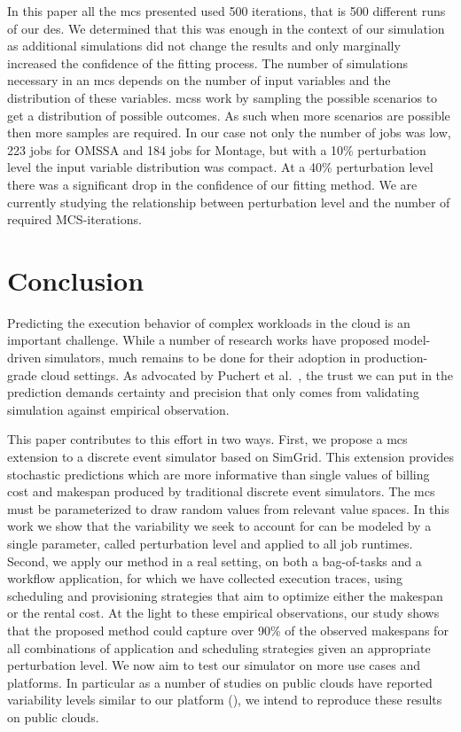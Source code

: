 \documentclass[10pt,conference,compsocconf]{IEEEtran}
\begin{document}
In this paper all the \ac{mcs} presented used 500 iterations, that is 500
different runs of our \ac{des}. We determined that this was enough in the
context of our simulation as additional simulations did not change the results
and only marginally increased the confidence of the fitting process. The number
of simulations necessary in an \ac{mcs} depends on the number of input variables
and the distribution of these variables. \aclp{mcs} work by sampling the possible
scenarios to get a distribution of possible outcomes. As such when more scenarios are
possible then more samples are required. In our case not only the number of jobs
was low, 223 jobs for OMSSA and 184 jobs for Montage, but with a 10\%
perturbation level the input variable distribution was compact. At a 40\%
perturbation level there was a significant drop in the confidence of our fitting
method. We are currently studying the relationship between perturbation level
and the number of required MCS-iterations.

\section{Conclusion}
Predicting  the execution  behavior  of complex  workloads in  the  cloud is  an
important challenge. While a number of research works have proposed model-driven
simulators, much remains to be done for their adoption in production-grade cloud
settings. As  advocated by Puchert  et al.~\cite{PucherGWK15}, the trust  we can
put in  the prediction  demands certainty  and precision  that only  comes from
validating simulation against empirical observation.

This paper contributes to this effort in two ways. First, we propose a \acl{mcs}
extension  to a  discrete  event  simulator based  on  SimGrid.  This  extension
provides stochastic predictions which are more informative than single values of
billing cost  and makespan  produced by  traditional discrete  event simulators.
The \acl{mcs}  must be parameterized to  draw random values from  relevant value
spaces. In this work we show that the  variability we seek to account for can be
modeled  by a  single parameter,  called perturbation  level and applied  to all  job
runtimes. Second, we apply our method in  a real setting, on both a bag-of-tasks
and a workflow  application, for which we have collected  execution traces, using
scheduling and provisioning strategies that  aim to optimize either the makespan
or the  rental cost.  At  the light to  these empirical observations,  our study
shows that the proposed method could capture over 90\% of the observed makespans
for  all  combinations  of  application   and  scheduling  strategies  given  an
appropriate perturbation  level.  We now aim  to test our simulator  on more use
cases and platforms.  In particular as a number of studies on public clouds have
reported variability levels similar to our platform (\cite{LeitnerC16,pics}), we
intend to reproduce these results on public clouds.










\newpage
\end{document}
